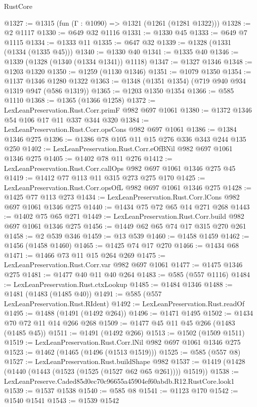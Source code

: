 \begin{lexlean}{RustCore}
\begin{coremodule}
@1327 := @1315 (fun (Γ : @1090) => @1321 (@1261 (@1281 @1322)))
@1328 := @2 @1117
@1330 := @649 @32 @1116
@1331 := @1330 @45
@1333 := @649 @7 @1115
@1334 := @1333 @11
@1335 := @647 @32
@1339 := @1328 (@1331 (@1334 (@1335 @45)))
@1340 := @1330 @40
@1341 := @1335 @40
@1346 := @1339 (@1328 (@1340 (@1334 @1341)) @1118)
@1347 := @1327 @1346
@1348 := @1203 @1320
@1350 := @1259 (@1130 @1346)
@1351 := @1079 @1350
@1354 := @1137 @1346 @1280 @1322
@1363 := @1348 (@1351 @1354) (@719 @940 @934 @1319 @947 (@586 @1319))
@1365 := @1203 @1350 @1354
@1366 := @585 @1110
@1368 := @1365 (@1366 @1258)
@1372 := LexLeanPreservation.Rust.Corr.primF @982 @697 @1061
@1380 := @1372 @1346 @54 @106 @17 @11 @337 @344 @320
@1384 := LexLeanPreservation.Rust.Corr.opsCons @982 @697 @1061
@1386 := @1384 @1346 @275
@1396 := @1386 @78 @105 @11 @15 @276 @336 @343 @244 @135 @250
@1402 := LexLeanPreservation.Rust.Corr.eOfBNil @982 @697 @1061 @1346 @275
@1405 := @1402 @78 @11 @276
@1412 := LexLeanPreservation.Rust.Corr.callOps @982 @697 @1061 @1346 @275 @45
@1419 := @1412 @77 @113 @11 @315 @273 @275 @170
@1425 := LexLeanPreservation.Rust.Corr.opsOfL @982 @697 @1061 @1346 @275
@1428 := @1425 @77 @113 @273
@1434 := LexLeanPreservation.Rust.Corr.lCons @982 @697 @1061 @1346 @275
@1440 := @1434 @75 @72 @65 @14 @271 @268
@1443 := @1402 @75 @65 @271
@1449 := LexLeanPreservation.Rust.Corr.build @982 @697 @1061 @1346 @275
@1456 := @1449 @62 @65 @74 @17 @315 @270 @261
@1458 := @2 @539 @346
@1459 := @13 @539
@1460 := @1458 @1459
@1462 := @1456 (@1458 @1460)
@1465 := @1425 @74 @17 @270
@1466 := @1434 @68
@1471 := @1466 @73 @11 @15 @264 @269
@1475 := LexLeanPreservation.Rust.Corr.var @982 @697 @1061
@1477 := @1475 @1346 @275
@1481 := @1477 @40 @11 @40 @264
@1483 := @585 (@557 @1116)
@1484 := LexLeanPreservation.Rust.ctxLookup
@1485 := @1484 @1346
@1488 := @1481 (@1483 (@1485 @40))
@1491 := @585 (@557 LexLeanPreservation.Rust.RIdent)
@1492 := LexLeanPreservation.Rust.readOf
@1495 := @1488 (@1491 (@1492 @264))
@1496 := @1471 @1495
@1502 := @1434 @70 @72 @11 @14 @266 @268
@1509 := @1477 @45 @11 @45 @266 (@1483 (@1485 @45))
@1511 := @1491 (@1492 @266)
@1513 := @1502 (@1509 @1511)
@1519 := LexLeanPreservation.Rust.Corr.lNil @982 @697 @1061 @1346 @275
@1523 := @1462 (@1465 (@1496 (@1513 @1519)))
@1525 := @585 (@557 @8)
@1527 := LexLeanPreservation.Rust.buildShape @982
@1537 := @1419 (@1428 (@1440 (@1443 (@1523 (@1525 (@1527 @62 @65 @261)))) @1519))
@1538 := LexLeanPreserve.Caded85d0ec70c96655a45904ef60abdb.R12.RustCore.look1
@1539 := @1537 @1538
@1540 := @585 @8
@1541 := @1123 @170
@1542 := @1540 @1541
@1543 := @1539 @1542

\end{coremodule}
\end{lexlean}
